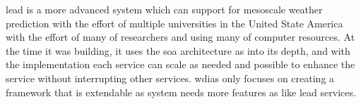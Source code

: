 \acrshort{lead} is a more advanced system which can support for mesoscale weather prediction with the effort of multiple universities in the United State America with the effort of many of researchers and using many of computer resources. At the time it was building, it uses the \acrshort{soa} architecture as into its depth, and with the implementation each service can scale as needed and possible to enhance the service without interrupting other services. \acrshort{wdias} only focuses on creating a framework that is extendable as system needs more features as like \acrshort{lead} services.

